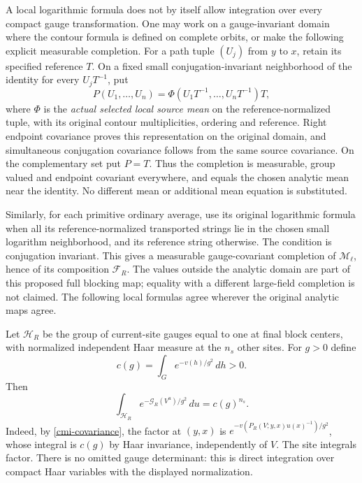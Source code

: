 A local logarithmic formula does not by itself allow integration
over every compact gauge transformation. One may work on a
gauge-invariant domain where the contour formula is defined on
complete orbits, or make the following explicit measurable
completion. For a path tuple $(U_j)$ from $y$ to $x$, retain its
specified reference $T$. On a fixed small conjugation-invariant
neighborhood of the identity for every $U_jT^{-1}$, put
\[
 P(U_1,\ldots,U_n)
   =\Phi(U_1T^{-1},\ldots,U_nT^{-1})T,
\]
where $\Phi$ is the \emph{actual selected local source mean}
on the reference-normalized tuple, with its original contour
multiplicities, ordering and reference. Right endpoint covariance
proves this representation on the original domain, and simultaneous
conjugation covariance follows from the same source covariance.
On the complementary set put $P=T$. Thus the completion is
measurable, group valued and endpoint covariant everywhere,
and equals the chosen analytic mean near the identity. No
different mean or additional mean equation is substituted.

Similarly, for each primitive ordinary average, use its original
logarithmic formula when all its reference-normalized transported
strings lie in the chosen small logarithm neighborhood, and its
reference string otherwise. The condition is conjugation invariant.
This gives a measurable gauge-covariant completion of
$\mathcal M_\ell$, hence of its composition $\mathcal F_R$.
The values outside the analytic domain are part of this proposed
full blocking map; equality with a different large-field completion
is not claimed. The following local formulas agree wherever
the original analytic maps agree.

Let $\mathcal H_R$ be the group of current-site gauges equal to
one at final block centers, with normalized independent Haar
measure at the $n_s$ other sites. For $g>0$ define
\begin{equation}\label{cmi-gauge-constant}
 c(g)=\int_G e^{-v(h)/g^2}\,dh>0.
\end{equation}
Then
\begin{equation}\label{cmi-orbit-identity}
 \int_{\mathcal H_R}e^{-\mathcal G_R(V^u)/g^2}\,du
       =c(g)^{n_s}.
\end{equation}
Indeed, by \eqref{cmi-covariance}, the factor at $(y,x)$ is
$e^{-v(P_R(V;y,x)u(x)^{-1})/g^2}$, whose integral is $c(g)$
by Haar invariance, independently of $V$. The site integrals
factor. There is no omitted gauge determinant: this is direct
integration over compact Haar variables with the displayed
normalization.

